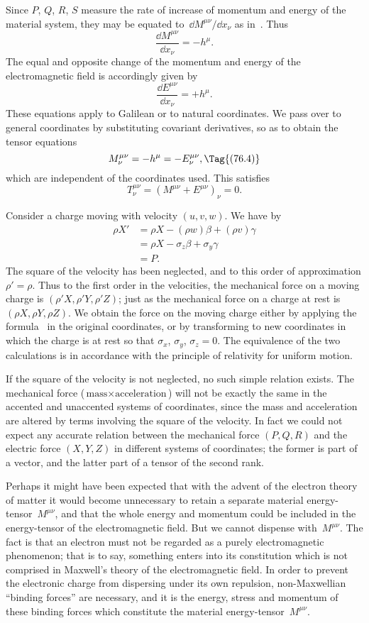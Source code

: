 \documentclass[12pt]{book}
\begin{document}
Since $P$, $Q$, $R$, $S$ measure the rate of increase of momentum and energy
of the material system, they may be equated to~$\dd M^{\mu\nu}/\dd x_{\nu}$ as in~. Thus
\[
\frac{\dd M^{\mu\nu}}{\dd x_{\nu}} = -h^{\mu}.
\]
The equal and opposite change of the momentum and energy of the electromagnetic
field is accordingly given by
\[
\frac{\dd E^{\mu\nu}}{\dd x_{\nu}} = +h^{\mu}.
\]
These equations apply to Galilean or to natural coordinates. We pass over to
general coordinates by substituting covariant derivatives, so as to obtain the
tensor equations
\[
M_{\nu}^{\mu\nu} = -h^{\mu} = -E_{\nu}^{\mu\nu},
\Tag{(76.4)}
\]
which are independent of the coordinates used. This satisfies
\[
T_{\nu}^{\mu\nu} = (M^{\mu\nu} + E^{\mu\nu})_{\nu} = 0.
\]

Consider a charge moving with velocity $(u, v, w)$. We have by~
\begin{align*}
  \rho X' &= \rho X - (\rho w)\beta + (\rho v)\gamma \\
  &= \rho X - \sigma_{z}\beta + \sigma_{y}\gamma \\
&= P.
\end{align*}
The square of the velocity has been neglected, and to this order of approximation
$\rho' = \rho$. Thus to the first order in the velocities, the mechanical force on
a moving charge is $(\rho'X, \rho'Y, \rho'Z)$; just as the mechanical force on a charge
at rest is $(\rho X, \rho Y, \rho Z)$. We obtain the force on the moving charge either by
applying the formula~ in the original coordinates, or by transforming to
new coordinates in which the charge is at rest so that $\sigma_{x}$, $\sigma_{y}$, $\sigma_{z} = 0$. The
equivalence of the two calculations is in accordance with the principle of
relativity for uniform motion.

If the square of the velocity is not neglected, no such simple relation
exists. The mechanical force ($\text{mass} \times \text{acceleration}$) will not be exactly the same
in the accented and unaccented systems of coordinates, since the mass and
acceleration are altered by terms involving the square of the velocity. In
fact we could not expect any accurate relation between the mechanical force
$(P, Q, R)$ and the electric force $(X, Y, Z)$ in different systems of coordinates; the
former is part of a vector, and the latter part of a tensor of the second rank.

Perhaps it might have been expected that with the advent of the electron
%
theory of matter it would become unnecessary to retain a separate material
energy-tensor~$M^{\mu\nu}$, and that the whole energy and momentum could be
included in the energy-tensor of the electromagnetic field. But we cannot
dispense with~$M^{\mu\nu}$. The fact is that an electron must not be regarded as a
purely electromagnetic phenomenon; that is to say, something enters into its
constitution which is not comprised in Maxwell's theory of the electromagnetic
field. In order to prevent the electronic charge from dispersing under its own
repulsion, non-Maxwellian ``binding forces'' are necessary, and it is the energy,
stress and momentum of these binding forces which constitute the material
energy-tensor~$M^{\mu\nu}$.
\end{document}
